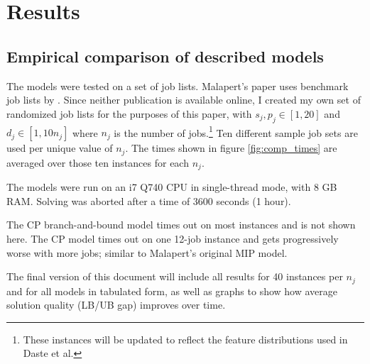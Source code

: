 \newpage
\chapter{Results}
\section{Empirical comparison of described models}\label{sec:results}
The models were tested on a set of job lists. Malapert's paper uses benchmark
job lists by \citet{daste1, daste2}. Since neither publication is
available online, I created my own set of randomized job lists for the purposes
of this paper, with $s_j, p_j \in [1, 20]$ and $d_j \in [1, 10n_j]$ where $n_j$ is
the number of jobs.\footnote{These instances will be updated to reflect the
feature distributions used in Daste et al.} Ten different sample job sets are
used per unique value of $n_j$. The times shown in figure \ref{fig:comp_times}
are averaged over those ten instances for each $n_j$.

The models were run on an i7 Q740 CPU in single-thread mode, with 8 GB RAM.
Solving was aborted after a time of 3600 seconds (1 hour).

The CP branch-and-bound model times out on most instances and is not shown here.
The CP model times out on one 12-job instance and gets progressively worse with
more jobs; similar to Malapert's original MIP model.

The final version of this document will include all results for 40 instances per $n_j$ and for all models in tabulated form, as well as graphs to show how average solution quality (LB/UB gap) improves over time.

